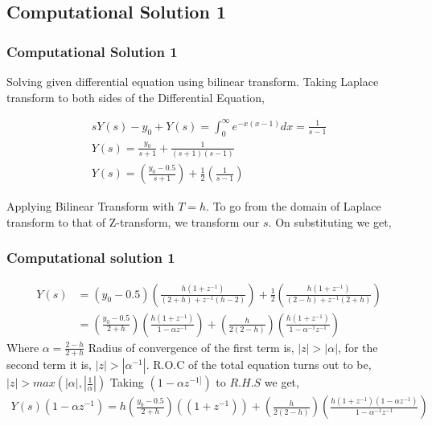 \documentclass{beamer}
\providecommand{\brak}[1]{\ensuremath{\left(#1\right)}}
\theoremstyle{remark}
\providecommand{\abs}[1]{\left\vert#1\right\vert}
\numberwithin{equation}{section}
\begin{document}
    \subsection{Computational Solution 1}
		\begin{frame}
			\frametitle{Computational Solution 1}
Solving given differential equation using bilinear transform.
Taking Laplace transform to both sides of the Differential Equation,

\begin{align}
  sY\brak{s} - y_0 + Y\brak{s} = \int_0^{\infty} e^{-x\brak{x - 1} } dx = \frac{1}{s-1}\\
  Y\brak{s} = \frac{y_0}{s+1} + \frac{1}{\brak{s + 1} \brak{s - 1}}\\
  Y\brak{s} = \brak{\frac{y_0 - 0.5}{s+1}} + \frac{1}{2}\brak{\frac{1}{s-1}}
\end{align}

Applying Bilinear Transform with $T=h$. To go from the domain of Laplace transform to that of Z-transform, we transform our $s$. On substituting we get,
    \end{frame}
		\begin{frame}
      \frametitle{Computational solution 1}
      {\small
\begin{align}
  Y\brak{s} &= \brak{y_0 - 0.5}\brak{\frac{h\brak{1 + z^{-1}} }{ \brak{2+h} + z^{-1}\brak{h-2} } } +\frac{1}{2}\brak{\frac{h\brak{1 + z^{-1}} }{ \brak{2-h} + z^{-1}\brak{2+h} } }\\
  &= \brak{\frac{y_0 - 0.5}{2+h}} \brak{\frac{h\brak{1 + z^{-1}}}{1 - \alpha z^{-1}} } + \brak{\frac{h}{2\brak{2-h}}}\brak{\frac{h\brak{1+z^{-1}}}{1 - \alpha^{-1}z^{-1}}}
\end{align}
      }
Where $\alpha = \frac{2-h}{2+h}$ \newline
Radius of convergence of the first term is, $\abs{z} > \abs{\alpha}$, for the second term it is, $\abs{z} > \abs{\alpha^{-1}}$. R.O.C of the total equation turns out to be, $\abs{z} > max \brak{\abs{\alpha}, \abs{\frac{1}{\alpha}}}$\newline
Taking $\brak{1 - \alpha z^{-1]}}$ to $R.H.S$ we get,
      {\tiny
\begin{align}
  Y\brak{s}\brak{1 - \alpha z^{-1}} = h\brak{\frac{y_0 - 0.5}{2+h}}\brak{\brak{1 + z^{-1}} } + \brak{\frac{h}{2\brak{2-h}}}\brak{\frac{h\brak{1+z^{-1}} \brak{1 - \alpha z^{-1}} }{1 - \alpha^{-1}z^{-1}}}
\end{align}
      }
    \end{frame}
\end{document}
